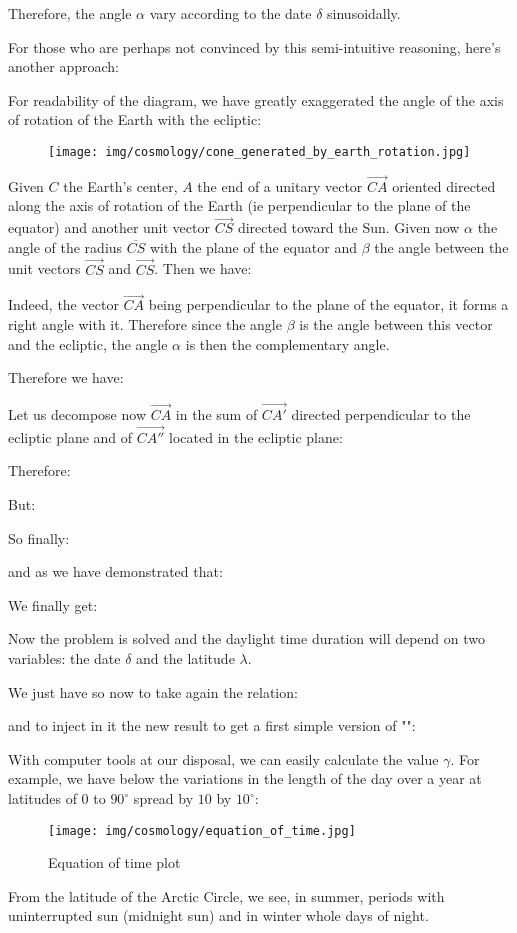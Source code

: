 	Therefore, the angle $\alpha$ vary according to the date $\delta$ sinusoidally.

	For those who are perhaps not convinced by this semi-intuitive reasoning, here's another approach:

	For readability of the diagram, we have greatly exaggerated the angle of the axis of rotation of the Earth with the ecliptic:
	\begin{figure}[H]
		\begin{center}
		\texttt{[image: img/cosmology/cone\_generated\_by\_earth\_rotation.jpg]}
		\end{center}
	\end{figure}
	Given $C$ the Earth's center, $A$ the end of a unitary vector $\overrightarrow{CA}$ oriented directed along the axis of rotation of the Earth (ie perpendicular to the plane of the equator) and another unit vector $\overrightarrow{CS}$ directed toward the Sun. Given now $\alpha$ the angle of the radius $\overline{CS}$  with the plane of the equator and $\beta$ the angle between the unit vectors  $\overrightarrow{CS}$ and  $\overrightarrow{CS}$. Then we have:
	
	Indeed, the vector $\overrightarrow{CA}$ being perpendicular to the plane of the equator, it forms a right angle with it. Therefore since the angle $\beta$ is the angle between this vector and the ecliptic, the angle $\alpha$ is then the complementary angle.
	
	Therefore we have:
	
	Let us decompose now $\overrightarrow{CA}$ in the sum of $\overrightarrow{CA'}$ directed perpendicular to the ecliptic plane and of $\overrightarrow{CA''}$ located in the ecliptic plane:
	
	Therefore:
	
	But:
	
	So finally:
	
	and as we have demonstrated that:
	
	We finally get:
	
	Now the problem is solved and the daylight time duration will depend on two variables: the date $\delta$ and the latitude $\lambda$.

	We just have so now to take again the relation:
	
	and to inject in it the new result to get a first simple version of "":
	
	With computer tools at our disposal, we can easily calculate the value $\gamma$. For example, we have below the variations in the length of the day over a year at latitudes of $0$ to $90^\circ$ spread by $10$ by $10^\circ$:
	\begin{figure}[H]
		\begin{center}
		\texttt{[image: img/cosmology/equation\_of\_time.jpg]}
		\caption{Equation of time plot}
		\end{center}
	\end{figure}
	From the latitude of the Arctic Circle, we see, in summer, periods with uninterrupted sun (midnight sun) and in winter whole days of night.


